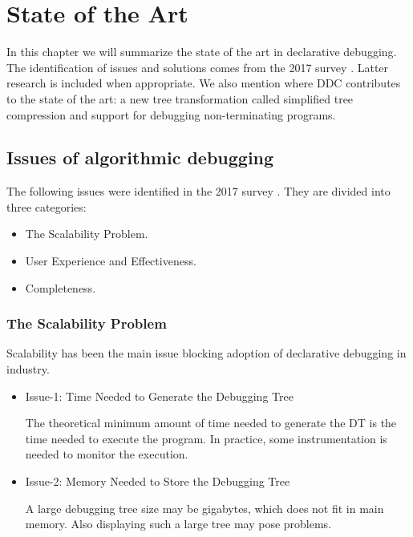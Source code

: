 \chapter{State of the Art}
\label{cap:stateOfTheArt}

In this chapter we will summarize the state of the art in declarative debugging.
%
The identification of issues and solutions comes from the 2017 survey \cite{Survey}. Latter research is included when appropriate. We also mention where DDC contributes to the state of the art: a new tree transformation called simplified tree compression and support for debugging non-terminating programs.

\section{Issues of algorithmic debugging}
The following issues were identified in the 2017 survey \cite{Survey}. They are divided into three categories:
\begin{itemize}
    \item The Scalability Problem.
    \item User Experience and Effectiveness.
    \item Completeness.
\end{itemize}
\subsection{The Scalability Problem}
Scalability has been the main issue blocking adoption of declarative debugging in industry.
\begin{itemize}
    \item Issue-1: Time Needed to Generate the Debugging Tree
    
The theoretical minimum amount of time needed to generate the DT is the time needed to execute the program. In practice, some instrumentation is needed to monitor the execution.
    \item Issue-2: Memory Needed to Store the Debugging Tree

A large debugging tree size may be gigabytes, which does not fit in main memory. Also displaying such a large tree may pose problems.
\end{itemize}
